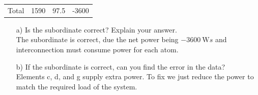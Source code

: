 \documentclass[a4paper]{article}
\begin{document}
\begin{itemize}
\begin{tabular}{l c c c}
	      	Total   & 1590                 & 97.5                   & -3600                                               
	      \end{tabular}	  
	      \begin{itemize}
	      	\item[a)] Is the subordinate correct? Explain your answer. \\
	      	      The subordinate is correct, due the net power being $\SI{-3600}{\watt}s$ and interconnection must consume power for each atom.
	      	\item[b)] If the subordinate is correct, can you find the error in the data?  \\
	      	      Elements c, d, and g supply extra power. To fix we just reduce the power to match the required load of the system.
	      \end{itemize} 
	      	      	      	      	      	      	      	      	      	      	      	      	      	      	      
\end{itemize}

  
\end{document}
